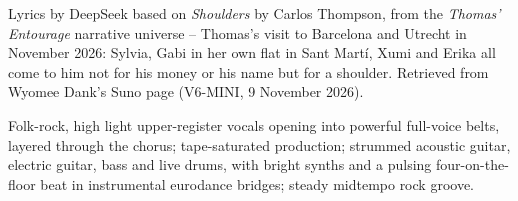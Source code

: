 
\label{sec:shoulders}
\begin{notes}
Lyrics by DeepSeek based on \emph{Shoulders} by Carlos Thompson, from the \emph{Thomas' Entourage} narrative universe -- Thomas's visit to Barcelona and Utrecht in November 2026: Sylvia, Gabi in her own flat in Sant Martí, Xumi and Erika all come to him not for his money or his name but for a shoulder. Retrieved from Wyomee Dank's Suno page (V6-MINI, 9 November 2026).
\end{notes}
\begin{style}
Folk-rock, high light upper-register vocals opening into powerful full-voice belts, layered through the chorus; tape-saturated production; strummed acoustic guitar, electric guitar, bass and live drums, with bright synths and a pulsing four-on-the-floor beat in instrumental eurodance bridges; steady midtempo rock groove.
\end{style}
